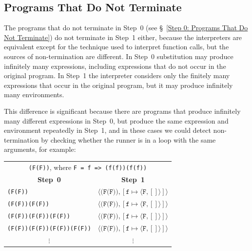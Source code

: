 \documentclass[12pt, oneside]{book}
\begin{document}
\subsection{Programs That Do Not Terminate}
\label{Step 1: Programs That Do Not Terminate}

The programs that do not terminate in Step~0 (see §~\ref{Step 0: Programs That Do Not Terminate}) do not terminate in Step~1 either, because the interpreters are equivalent except for the technique used to interpret function calls, but the sources of non-termination are different. In Step~0 substitution may produce infinitely many expressions, including expressions that do not occur in the original program. In Step~1 the interpreter considers only the finitely many expressions that occur in the original program, but it may produce infinitely many environments.

This difference is significant because there are programs that produce infinitely many different expressions in Step~0, but produce the same expression and environment repeatedly in Step~1, and in these cases we could detect non-termination by checking whether the runner is in a loop with the same arguments, for example:

\begin{center}
\begin{tabular}{ll}
\multicolumn{2}{c}{\texttt{(F(F))}, where \texttt{F = f => (f(f))(f(f))}} \\
\multicolumn{1}{c}{\textbf{Step~0}} & \multicolumn{1}{c}{\textbf{Step~1}} \\
\texttt{(F(F))} & $\langle \texttt{(F(F))}, [\texttt{f} \mapsto \langle \texttt{F}, [] \rangle] \rangle$ \\
\texttt{(F(F))(F(F))} & $\langle \texttt{(F(F))}, [\texttt{f} \mapsto \langle \texttt{F}, [] \rangle] \rangle$ \\
\texttt{(F(F))(F(F))(F(F))} & $\langle \texttt{(F(F))}, [\texttt{f} \mapsto \langle \texttt{F}, [] \rangle] \rangle$ \\
\texttt{(F(F))(F(F))(F(F))(F(F))} & $\langle \texttt{(F(F))}, [\texttt{f} \mapsto \langle \texttt{F}, [] \rangle] \rangle$ \\
\multicolumn{1}{c}{$\vdots$} & \multicolumn{1}{c}{$\vdots$} \\
\end{tabular}
\end{center}
\end{document}
